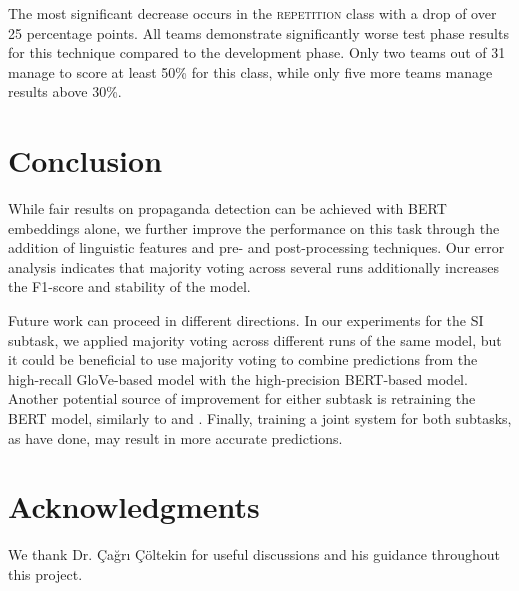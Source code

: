 \documentclass[11pt]{article}
\begin{document}
The most significant decrease occurs in the \textsc{repetition} class with a drop of over 25 percentage points.
All teams demonstrate significantly worse test phase results for this technique compared to the development phase.
Only two teams out of 31 manage to score at least 50\% for this class, while only five more teams manage results above 30\%.


\section{Conclusion}



While fair results on propaganda detection can be achieved with BERT embeddings alone, we further improve the performance on this task through the addition of linguistic features and pre- and post-processing techniques.
Our error analysis indicates that majority voting across several runs additionally increases the F1-score and stability of the model.

Future work can proceed in different directions.
In our experiments for the SI subtask, we applied majority voting across different runs of the same model,
but it could be beneficial 
to use majority voting
to combine predictions from the high-recall GloVe-based model with the high-precision BERT-based model.
Another potential source of improvement for either subtask is retraining the BERT model, similarly to  and .
Finally, training a joint system for both subtasks, 
as  have done, 
may result in more accurate predictions.


\section*{Acknowledgments}


We thank Dr. \c{C}a\u{g}r\i{} \c{C}{\"o}ltekin for useful discussions and his guidance throughout this project.





\newpage
\end{document}
